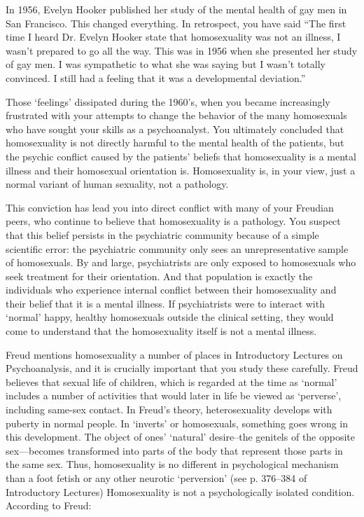 \begin{refsection}
In 1956, Evelyn Hooker published her study of the mental health of gay men in San Francisco. This changed everything. In retrospect, you have said “The first time I heard Dr. Evelyn Hooker state that homosexuality was not an illness, I wasn't prepared to go all the way. This was in 1956 when she presented her study of gay men. I was sympathetic to what she was saying but I wasn't totally convinced. I still had a feeling that it was a developmental deviation.”

Those `feelings' dissipated during the 1960's, when you became increasingly frustrated with your attempts to change the behavior of the many homosexuals who have sought your skills as a psychoanalyst. You ultimately concluded that homosexuality is not directly harmful to the mental health of the patients, but the psychic conflict caused by the patients' beliefs that homosexuality is a mental illness and their homosexual orientation is. Homosexuality is, in your view, just a normal variant of human sexuality, not a pathology.

This conviction has lead you into direct conflict with many of your Freudian peers, who continue to believe that homosexuality is a pathology. You suspect that this belief persists in the psychiatric community because of a simple scientific error: the psychiatric community only sees an unrepresentative sample of homosexuals. By and large, psychiatrists are only exposed to homosexuals who seek treatment for their orientation. And that population is exactly the individuals who experience internal conflict between their homosexuality and their belief that it is a mental illness. If psychiatrists were to interact with `normal' happy, healthy homosexuals outside the clinical setting, they would come to understand that the homosexuality itself is not a mental illness.

Freud mentions homosexuality a number of places in Introductory Lectures on Psychoanalysis, and it is crucially important that you study these carefully. Freud believes that sexual life of children, which is regarded at the time as `normal' includes a number of activities that would later in life be viewed as `perverse', including same-sex contact. In Freud's theory, heterosexuality develops with puberty in normal people. In `inverts' or homosexuals, something goes wrong in this development. The object of ones' `natural' desire--the genitels of the opposite sex—becomes transformed into parts of the body that represent those parts in the same sex. Thus, homosexuality is no different in psychological mechanism than a foot fetish or any other neurotic `perversion' (see p. 376--384 of Introductory Lectures) Homosexuality is not a psychologically isolated condition. According to Freud:


\end{refsection}
